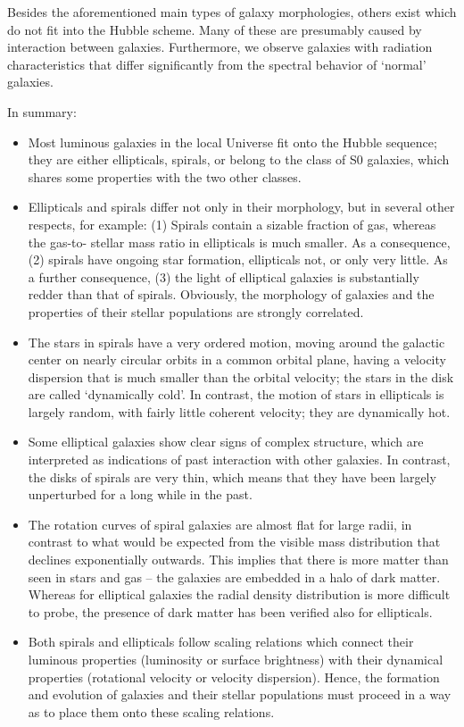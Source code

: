 \documentclass[a4paper,11pt]{article}
\begin{document}
{\noindent}Besides the aforementioned main types of galaxy morphologies, others exist which do not fit into the Hubble scheme. Many of these are presumably caused by interaction between galaxies. Furthermore, we observe galaxies with radiation characteristics that differ significantly from the spectral behavior of `normal' galaxies.

{\noindent}In summary:

\begin{itemize}
    \item Most luminous galaxies in the local Universe fit onto the Hubble sequence; they are either ellipticals, spirals, or belong to the class of S0 galaxies, which shares some properties with the two other classes.
    \item Ellipticals and spirals differ not only in their morphology, but in several other respects, for example: (1) Spirals contain a sizable fraction of gas, whereas the gas-to- stellar mass ratio in ellipticals is much smaller. As a consequence, (2) spirals have ongoing star formation, ellipticals not, or only very little. As a further consequence, (3) the light of elliptical galaxies is substantially redder than that of spirals. Obviously, the morphology of galaxies and the properties of their stellar populations are strongly correlated.
    \item The stars in spirals have a very ordered motion, moving around the galactic center on nearly circular orbits in a common orbital plane, having a velocity dispersion that is much smaller than the orbital velocity; the stars in the disk are called `dynamically cold'. In contrast, the motion of stars in ellipticals is largely random, with fairly little coherent velocity; they are dynamically hot.
    \item Some elliptical galaxies show clear signs of complex structure, which are interpreted as indications of past interaction with other galaxies. In contrast, the disks of spirals are very thin, which means that they have been largely unperturbed for a long while in the past.
    \item The rotation curves of spiral galaxies are almost flat for large radii, in contrast to what would be expected from the visible mass distribution that declines exponentially outwards. This implies that there is more matter than seen in stars and gas -- the galaxies are embedded in a halo of dark matter. Whereas for elliptical galaxies the radial density distribution is more difficult to probe, the presence of dark matter has been verified also for ellipticals.
    \item Both spirals and ellipticals follow scaling relations which connect their luminous properties (luminosity or surface brightness) with their dynamical properties (rotational velocity or velocity dispersion). Hence, the formation and evolution of galaxies and their stellar populations must proceed in a way as to place them onto these scaling relations.
\end{itemize}
\end{document}
